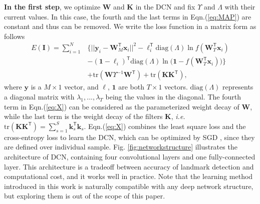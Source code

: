 \documentclass[10pt,journal,compsoc]{IEEEtran}
\newcommand{\x} {\textbf{x}}
\newcommand{\y} {\textbf{y}}
\newcommand{\W} {\textbf{W}}
\newcommand{\I} {\textbf{I}}
\newcommand{\K} {\textbf{K}}
\newcommand{\kk} {\textbf{k}}
\newcommand{\trans}[1]{{#1}^{\ensuremath{\mathsf{T}}}}
\newcommand{\ie}{\emph{i.e.}~}
\begin{document}
\vspace{0.1cm}
\textbf{In the first step}, we optimize $\W$ and $\K$ in the DCN and fix $\Upsilon$ and $\Lambda$ with their current values. In this case, the fourth and the last terms in Eqn.(\ref{eq:MAP}) are constant and thus can be removed. We write the loss function in a matrix form as follows
\begin{equation}\label{eq:X}
\begin{split}
E(\I)=\sum_{i=1}^N&\Big\{||\y_i-\trans{\W}_{M}\x_i||^2-
\trans{\bm{\ell}}_i\mathrm{diag}(\Lambda)\ln f(\trans{\W}_{T}\x_i)\\
&-\trans{(\textbf{1}-\bm{\ell}_i)}\mathrm{diag}(\Lambda)\ln\big(\textbf{1}-f(\trans{\W}_{T}\x_i)\big)\Big\}
\\&+\mathrm{tr}(\W\Upsilon^{-1}\trans{\W})+\mathrm{tr}(\K\trans{\K}),
\end{split}
\end{equation}
where $\y$ is a $M\times1$ vector, and $\bm{\ell}$, $\textbf{1}$ are both $T\times1$ vectors. $\mathrm{diag}(\Lambda)$ represents a diagonal matrix with $\lambda_1,...,\lambda_T$ being the values in the diagonal.
The fourth term in Eqn.(\ref{eq:X}) can be considered as the parameterized weight decay of $\W$, while the last term is the weight decay of the filters $\K$, \ie $\mathrm{tr}(\K\trans{\K})=\sum_{s=1}^S\trans{\kk}_s\kk_s$.
Eqn.(\ref{eq:X}) combines the least square loss and the cross-entropy loss to learn the DCN, which can be optimized by SGD \cite{krizhevsky2012imagenet}, since they are defined over individual sample.
Fig. \ref{fig:networkstructure} illustrates the architecture of DCN, containing four convolutional layers and one fully-connected layer. This architecture is a tradeoff between accuracy of landmark detection and computational cost, and it works well in practice. Note that the learning method introduced in this work is naturally compatible with any deep network structure, but exploring them is out of the scope of this paper.
\end{document}
